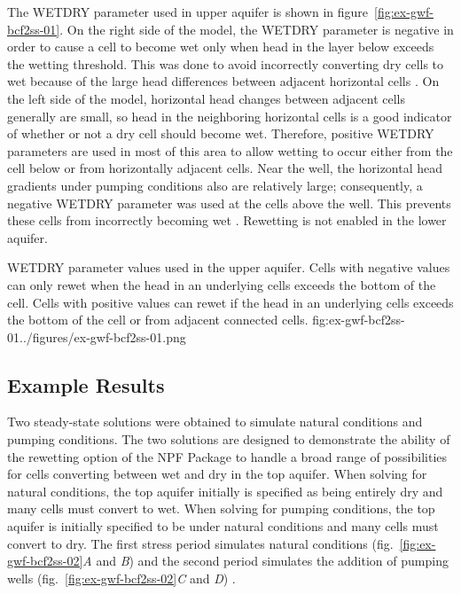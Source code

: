 The WETDRY parameter used in upper aquifer is shown in figure~\ref{fig:ex-gwf-bcf2ss-01}. On the right side of the model, the
WETDRY parameter is negative in order to cause a cell to become wet only when head in the layer below exceeds the wetting threshold. This was done to avoid incorrectly converting dry cells to wet because of the large head differences between adjacent horizontal cells \citep{mcdonaldetal1991wetdry}. On the left side of the model, horizontal head changes between adjacent cells generally are small, so head in the neighboring horizontal cells is a good indicator of whether or not a dry cell should become wet. Therefore, positive WETDRY parameters are used in most of this area to allow wetting to occur either from the cell below or from horizontally adjacent cells. Near the well, the horizontal head gradients under pumping conditions also are relatively large; consequently, a negative WETDRY parameter was used at the cells above the well. This prevents these cells from incorrectly becoming wet \citep{mcdonaldetal1991wetdry}. Rewetting is not enabled in the lower aquifer.

\begin{StandardFigure}{
                                     WETDRY parameter values used in the upper aquifer. Cells with negative values
                                     can only rewet when the head in an underlying cells exceeds the bottom of the cell.
                                     Cells with positive values can rewet if the head in an underlying cells exceeds the 
                                     bottom of the cell or from adjacent connected cells.
                                     }{fig:ex-gwf-bcf2ss-01}{../figures/ex-gwf-bcf2ss-01.png}
\end{StandardFigure}                                 


\subsection{Example Results}

Two steady-state solutions were obtained to simulate natural conditions and pumping conditions. The two solutions are designed to demonstrate the ability of the rewetting option of the NPF Package to handle a broad range of possibilities for cells converting between wet and dry in the top aquifer. When solving for natural conditions, the top aquifer initially is specified as being entirely dry and many cells must convert to wet. When solving for pumping conditions, the top aquifer is initially specified to be under natural conditions and many cells must convert to dry. The first stress period simulates natural conditions (fig.~\ref{fig:ex-gwf-bcf2ss-02}\textit{A} and \textit{B}) and the second period simulates the addition of pumping wells (fig.~\ref{fig:ex-gwf-bcf2ss-02}\textit{C} and \textit{D}) .

